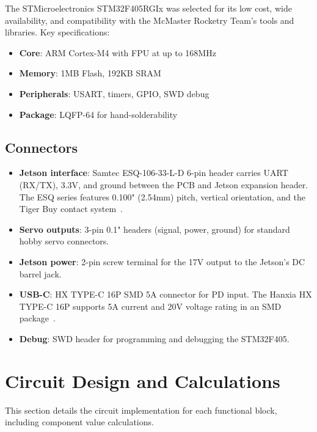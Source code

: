 \documentclass[12pt, titlepage]{article}
\begin{document}
The STMicroelectronics STM32F405RGIx was selected for its low cost, wide
availability, and compatibility with the McMaster Rocketry Team's tools and
libraries. Key specifications: ~\citep{ST_STM32F405_2022}

\begin{itemize}[leftmargin=*]
  \item \textbf{Core}: ARM Cortex-M4 with FPU at up to 168MHz
  \item \textbf{Memory}: 1MB Flash, 192KB SRAM
  \item \textbf{Peripherals}: USART, timers, GPIO, SWD debug
  \item \textbf{Package}: LQFP-64 for hand-solderability
\end{itemize}

\subsection{Connectors}

\begin{itemize}[leftmargin=*]
  \item \textbf{Jetson interface}: Samtec ESQ-106-33-L-D 6-pin header
        carries UART (RX/TX), 3.3V, and ground between the PCB and
        Jetson expansion header. The ESQ series features 0.100" (2.54mm)
        pitch, vertical orientation, and the Tiger Buy contact
        system~\citep{Samtec_ESQ_2024}.
  \item \textbf{Servo outputs}: 3-pin 0.1" headers (signal, power,
        ground) for standard hobby servo connectors.
  \item \textbf{Jetson power}: 2-pin screw terminal for the 17V output
        to the Jetson's DC barrel jack.
  \item \textbf{USB-C}: HX TYPE-C 16P SMD 5A connector for PD input.
        The Hanxia HX TYPE-C 16P supports 5A current and 20V voltage
        rating in an SMD package~\citep{Hanxia_TYPEC_2024}.
  \item \textbf{Debug}: SWD header for programming and debugging the
        STM32F405.
\end{itemize}

\section{Circuit Design and Calculations}
\label{sec:circuit-design}

This section details the circuit implementation for each functional block,
including component value calculations.
\end{document}
